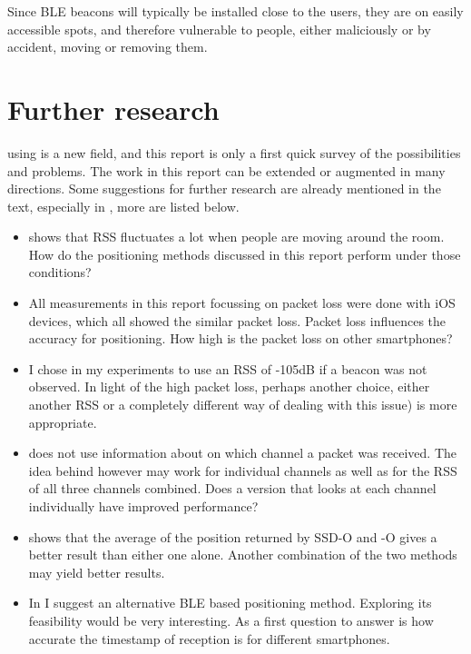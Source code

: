 Since BLE beacons will typically be installed close to the users, they are on easily accessible spots, and therefore vulnerable to people, either maliciously or by accident, moving or removing them.

\section{Further research}
\Ptfp using \BLE is a new field, and this report is only a first quick survey of the possibilities and problems.
The work in this report can be extended or augmented in many directions.
Some suggestions for further research are already mentioned in the text, especially in , more are listed below.

\begin{itemize}
    \item {} shows that RSS fluctuates a lot when people are moving around the room.
        How do the positioning methods discussed in this report perform under those conditions?

    \item All measurements in this report focussing on packet loss were done with iOS devices, which all showed the similar packet loss.
        Packet loss influences the accuracy for positioning.
        How high is the packet loss on other smartphones?

    \item I chose in my experiments to use an RSS of -105dB if a beacon was not observed.
        In light of the high packet loss, perhaps another choice, either another RSS or a completely different way of dealing with this issue) is more appropriate.

    \item \aBRP does not use information about on which channel a packet was received.
        The idea behind \aBRP however may work for individual channels as well as for the RSS of all three channels combined.
        Does a \BRP version that looks at each channel individually have improved performance?

    \item {} shows that the average of the position returned by SSD-O and \aBRP-O gives a better result than either one alone.
        Another combination of the two methods may yield better results.

    \item In  I suggest an alternative BLE based positioning method.
        Exploring its feasibility would be very interesting.
        As a first question to answer is how accurate the timestamp of reception is for different smartphones.
\end{itemize}
